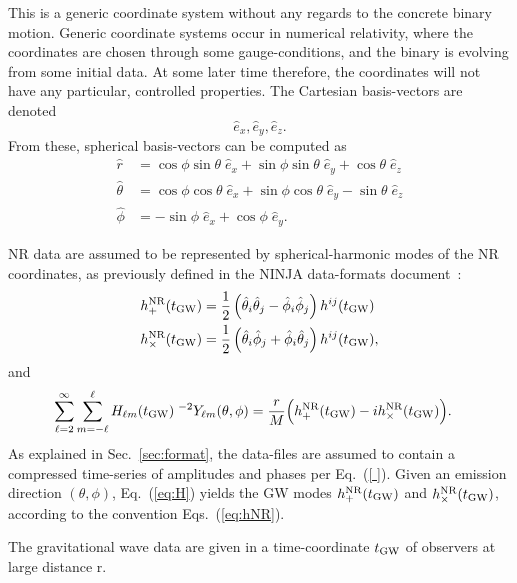 \documentclass[11pt,tightenlines,article,amssymb,amsmath,amsfonts,superscriptaddress,nofootinbib]{revtex4}
\newcommand{\ExNR}{\hat e_x}
\newcommand{\EyNR}{\hat e_y}
\newcommand{\EzNR}{\hat e_z}
\newcommand{\tNR}{\theta}
\newcommand{\pNR}{\phi}
\newcommand{\ErNR}{{\hat r}}
\newcommand{\EtNR}{{\hat\theta}}
\newcommand{\EpNR}{{\hat\phi}}
\newcommand{\hpNR}{h_+^{\rm NR}}
\newcommand{\hcNR}{h_{\times}^{\rm NR}}
\newcommand{\tGW}{t_{\rm GW}}
\begin{document}
This is a generic coordinate system without any regards to the
concrete binary motion. Generic coordinate systems occur in numerical
relativity, where the coordinates are chosen through some
gauge-conditions, and the binary is evolving from some initial data.
At some later time therefore, the coordinates will not have any
particular, controlled properties.
The Cartesian basis-vectors are denoted
\begin{equation}
  \ExNR, \EyNR, \EzNR.
\end{equation}
From these, spherical basis-vectors can be computed as
\begin{subequations}
  \label{eq:NRspherical}
\begin{align}
  \ErNR & = \cos\pNR\sin\tNR\;\ExNR + \sin\pNR\sin\tNR\;\EyNR +\cos\tNR\;\EzNR\\
  \EtNR & = \cos\pNR\cos\tNR\;\ExNR + \sin\pNR\cos\tNR\;\EyNR -\sin\tNR\;\EzNR\\
  \EpNR & =        -\sin\pNR\;\ExNR +         \cos\pNR\;\EyNR.
\end{align}
\end{subequations}

NR data are assumed to be represented by spherical-harmonic modes of the
NR coordinates, as previously defined in the NINJA data-formats
document~\cite{Brown:2007jx}:
\begin{subequations}\label{eq:hNR}
\begin{align}
  \hpNR(\tGW) & = \frac{1}{2}\left(\EtNR_i\EtNR_j-\EpNR_i\EpNR_j\right)h^{ij}(\tGW)\\
  \hcNR(\tGW) & = \frac{1}{2}\left(\EtNR_i\EpNR_j+\EpNR_i\EtNR_j\right)h^{ij}(\tGW),
\end{align}
\end{subequations}
and
\begin{align}\label{eq:H}
  \sum_{\ell=2}^\infty\sum_{m=-\ell}^\ell H_{\ell m}&(\tGW)\;^{-2}Y_{\ell m}(\tNR,\pNR)
  = \frac{r}{M}\Big(\hpNR(\tGW)-i\hcNR(\tGW)\Big). 
\end{align}
As explained in Sec.~\ref{sec:format}, the data-files are assumed to
contain a compressed time-series of amplitudes and phases per
Eq.~(\ref{ }).  Given an emission direction $(\tNR,\pNR)$,
Eq.~(\ref{eq:H}) yields the GW modes $\hpNR(\tGW)$ and $\hcNR(\tGW)$,
according to the convention Eqs.~(\ref{eq:hNR}).

The gravitational wave data are given in a time-coordinate $\tGW$ of
observers at large distance r.
\end{document}
